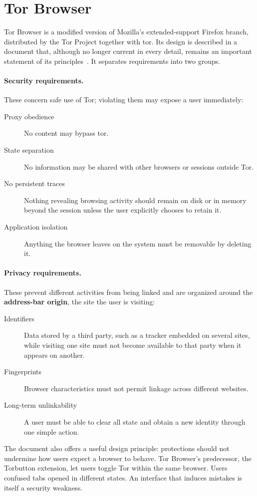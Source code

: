 \section{Tor Browser}\label{sec:browser-tb}

Tor Browser is a modified version of Mozilla's extended-support Firefox branch, distributed by the Tor Project together with tor. Its design is described in a document that, although no longer current in every detail, remains an important statement of its principles~\cite{perry2018torbrowser}. It separates requirements into two groups.

\paragraph{Security requirements.} These concern safe use of Tor; violating them may expose a user immediately:
\begin{description}
  \item[Proxy obedience] No content may bypass tor.
  \item[State separation] No information may be shared with other browsers or sessions outside Tor.
  \item[No persistent traces] Nothing revealing browsing activity should remain on disk or in memory beyond the session unless the user explicitly chooses to retain it.
  \item[Application isolation] Anything the browser leaves on the system must be removable by deleting it.
\end{description}

\paragraph{Privacy requirements.} These prevent different activities from being linked and are organized around the \textbf{address-bar origin}, the site the user is visiting:
\begin{description}
  \item[Identifiers] Data stored by a third party, such as a tracker embedded on several sites, while visiting one site must not become available to that party when it appears on another.
  \item[Fingerprints] Browser characteristics must not permit linkage across different websites.
  \item[Long-term unlinkability] A user must be able to clear all state and obtain a new identity through one simple action.
\end{description}
The document also offers a useful design principle: protections should not undermine how users expect a browser to behave. Tor Browser's predecessor, the Torbutton extension, let users toggle Tor within the same browser. Users confused tabs opened in different states. An interface that induces mistakes is itself a security weakness.

